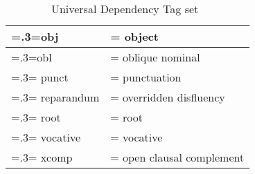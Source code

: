 \begin{table}[H]
\begin{tabularx}{0.8\textwidth}{|>{\hsize=.3\hsize\linewidth=\hsize}X|>{\hsize=0.7\hsize\linewidth=\hsize}X|}
        \hline
        obj & object \\
        \hline
        obl & oblique nominal \\
        \hline
        punct & punctuation \\
        \hline
        reparandum & overridden disfluency \\
        \hline
        root & root \\
        \hline
        vocative & vocative \\
        \hline
        xcomp & open clausal complement \\
    \hline
    \end{tabularx}
    \caption{Universal Dependency Tag set~\cite{universal_deps}}
    \label{appendix:deps}
    \end{table}